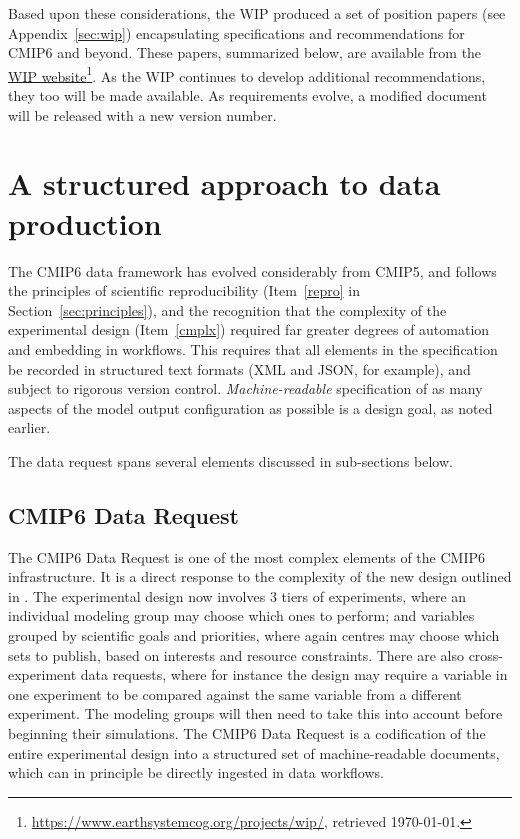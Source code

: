 \documentclass[gmd,manuscript]{copernicus}
\newcommand{\pllabel}[1]{\label{p-#1}\linelabel{l-#1}}
\newcommand{\urlref}[2] {\href{#1}{#2}\footnote{\url{#1}, retrieved \today.}}
\begin{document}
Based upon these considerations, the WIP produced a set of position
papers (see Appendix~\ref{sec:wip}) encapsulating specifications and
recommendations for CMIP6 and beyond. These papers, summarized below,
are available from the
\urlref{https://www.earthsystemcog.org/projects/wip/}{WIP website}. As
the WIP continues to develop additional recommendations, they too will
be made available. As requirements evolve, a modified document will
be released with a new version number.

\section{A structured approach to data production}
\label{sec:dreq}

The CMIP6 data framework has evolved considerably from CMIP5, and
follows the principles of scientific reproducibility (Item~\ref{repro}
in Section~\ref{sec:principles}), and the recognition that the
complexity of the experimental design (Item~\ref{cmplx}) required far
greater degrees of automation and embedding in workflows. This
requires that all elements in the specification be recorded in
structured text formats (XML and JSON, for example), and subject to
rigorous version control. \emph{Machine-readable} specification of as
many aspects of the model output configuration as possible is a
design goal, as noted earlier.

The data request spans several elements discussed in sub-sections
below.

\subsection{CMIP6 Data Request}
\label{sec:data-request}

\pllabel{RC2-18}
The CMIP6 Data Request is one of the most complex elements of the
CMIP6 infrastructure. It is a direct response to the complexity of the
new design outlined in \cite{ref:eyringetal2016a}. The experimental
design now involves 3 tiers of experiments, where an individual
modeling group may choose which ones to perform; and variables grouped
by scientific goals and priorities, where again centres may choose
which sets to publish, based on interests and resource constraints.
There are also cross-experiment data requests, where for instance the
design may require a variable in one experiment to be compared against
the same variable from a different experiment. The modeling groups
will then need to take this into account before beginning their
simulations. The CMIP6 Data Request is a codification of the entire
experimental design into a structured set of machine-readable
documents, which can in principle be directly ingested in data
workflows.
\end{document}
